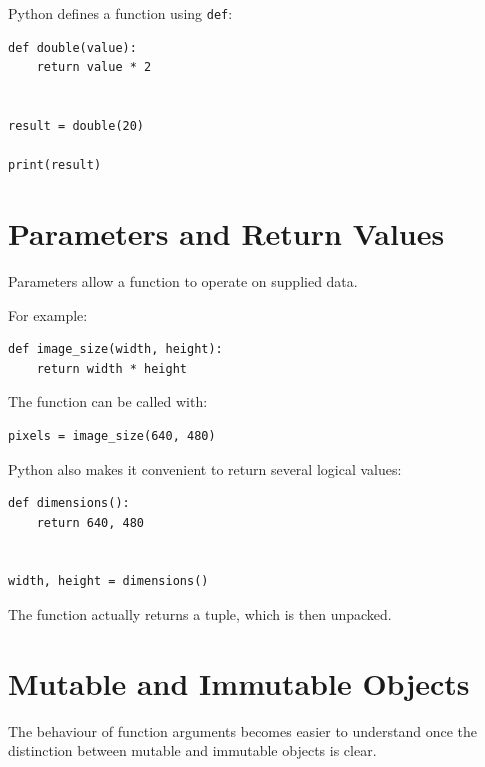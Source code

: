 Python defines a function using \texttt{def}:

\begin{listing}[htbp]
    \caption{A simple Python function.}
    \label{lst:simple-python-function}

\begin{verbatim}
def double(value):
    return value * 2


result = double(20)

print(result)
\end{verbatim}

\end{listing}


\section{Parameters and Return Values}
\label{sec:function-parameters}

Parameters allow a function to operate on supplied data.

For example:

\begin{verbatim}
def image_size(width, height):
    return width * height
\end{verbatim}

The function can be called with:

\begin{verbatim}
pixels = image_size(640, 480)
\end{verbatim}

Python also makes it convenient to return several logical values:

\begin{verbatim}
def dimensions():
    return 640, 480


width, height = dimensions()
\end{verbatim}

The function actually returns a tuple, which is then unpacked.


\section{Mutable and Immutable Objects}
\label{sec:python-mutability}

The behaviour of function arguments becomes easier to understand once
the distinction between mutable and immutable objects is clear.

